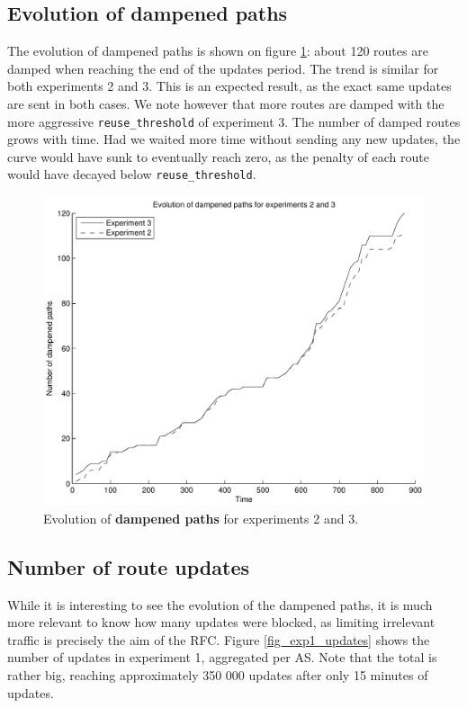 \documentclass[a4paper,english]{IEEEtran}
\begin{document}
\subsection{Evolution of dampened paths}

The evolution of dampened paths is shown on figure \ref{fig_dampenedpaths}: about 120 routes
are damped when reaching the end of the updates period.
The trend is similar for both experiments 2 and 3.
This is an expected result, as the exact same updates are sent in both cases.
We note however that more routes are damped with the more aggressive \texttt{\small reuse\_threshold} of experiment 3.
The number of damped routes grows with time.
Had we waited more time without sending any new updates, the curve would have sunk to eventually reach zero, as the penalty 
of each route would have decayed below \texttt{\small reuse\_threshold}.

\begin{figure}
\begin{center}
\includegraphics[scale=.5]{img/dampened_paths.pdf}
\end{center}
\caption{Evolution of \textbf{dampened paths} for experiments 2 and 3.}
\label{fig_dampenedpaths}
\end{figure}

\subsection{Number of route updates}

While it is interesting to see the evolution of the dampened paths, it is much more relevant 
to know how many updates were blocked, as limiting irrelevant traffic is precisely the aim of
the RFC. Figure \ref{fig_exp1_updates} shows the number of updates in experiment 1, aggregated 
per AS. Note that the total is rather big, reaching approximately 350 000 updates after only 
15 minutes of updates. 
\end{document}
